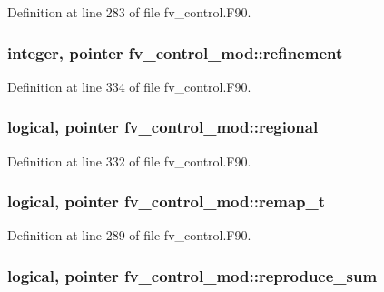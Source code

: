 Definition at line 283 of file fv\-\_\-control.\-F90.

\subsubsection[{refinement}]{\setlength{\rightskip}{0pt plus 5cm}integer, pointer fv\-\_\-control\-\_\-mod\-::refinement\hspace{0.3cm}{\ttfamily [private]}}\label{classfv__control__mod_a1ea5ca193a308c6557a1d51c1cd78e5c}


Definition at line 334 of file fv\-\_\-control.\-F90.

\subsubsection[{regional}]{\setlength{\rightskip}{0pt plus 5cm}logical, pointer fv\-\_\-control\-\_\-mod\-::regional\hspace{0.3cm}{\ttfamily [private]}}\label{classfv__control__mod_a2c117981e3eaaa04ed8665dc676cae1a}


Definition at line 332 of file fv\-\_\-control.\-F90.

\subsubsection[{remap\-\_\-t}]{\setlength{\rightskip}{0pt plus 5cm}logical, pointer fv\-\_\-control\-\_\-mod\-::remap\-\_\-t\hspace{0.3cm}{\ttfamily [private]}}\label{classfv__control__mod_a8bef0383195e3a490e60402a03274b8a}


Definition at line 289 of file fv\-\_\-control.\-F90.

\subsubsection[{reproduce\-\_\-sum}]{\setlength{\rightskip}{0pt plus 5cm}logical, pointer fv\-\_\-control\-\_\-mod\-::reproduce\-\_\-sum\hspace{0.3cm}{\ttfamily [private]}}\label{classfv__control__mod_a668baeb813fce15e439934c6a8fb6ea1}


